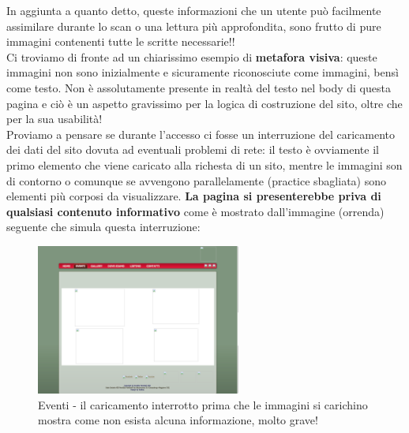 \documentclass[../Relazione.tex]{subfiles}
\begin{document}
\begin{itemize}
            In aggiunta a quanto detto, queste informazioni che un utente può facilmente assimilare durante lo scan o una lettura più approfondita, sono frutto di pure immagini contenenti tutte le scritte necessarie!!\\
            Ci troviamo di fronte ad un chiarissimo esempio di \textbf{metafora visiva}: queste immagini non sono inizialmente e sicuramente riconosciute come immagini, bensì come testo.
            Non è assolutamente presente in realtà del testo nel body di questa pagina e ciò è un aspetto gravissimo per la logica di costruzione del sito, oltre che per la sua usabilità!\\
            Proviamo a pensare se durante l'accesso ci fosse un interruzione del caricamento dei dati del sito dovuta ad eventuali problemi di rete: il testo è ovviamente il primo elemento che viene caricato alla richesta di un sito, mentre le immagini son di contorno o comunque se avvengono parallelamente (practice sbagliata) sono elementi più corposi da visualizzare.
            \textbf{La pagina si presenterebbe priva di qualsiasi contenuto informativo} come è mostrato dall'immagine (orrenda) seguente che simula questa interruzione:

            \begin{figure}[!h]
                \centering
                \includegraphics[width=0.6\textwidth]{img/sito/Eventi_noimage.png}
                \caption{Eventi - il caricamento interrotto prima che le immagini si carichino mostra come non esista alcuna informazione, molto grave!}
                \label{fig:noInfo}
            \end{figure}

        \end{itemize}
\end{document}
